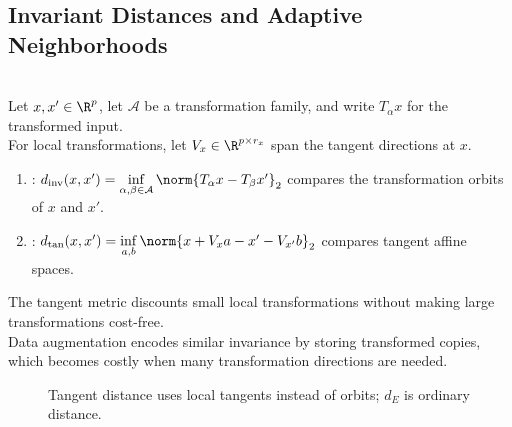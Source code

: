 \subsection{Invariant Distances and Adaptive Neighborhoods}
\begin{method} \label{meth:sl-invariant-and-tangent-distance} \\
Let $x,x'\in\R^p$, let $\mathcal{A}$ be a transformation family, and write $T_\alpha x$ for the transformed input.\\
For local transformations, let $V_x\in\R^{p\times r_x}$ span the tangent directions at $x$.
\begin{enumerate}[label=(\roman*)]
\setlength{\itemsep}{0pt}
\item {}: $d_{\mathrm{inv}}(x,x')=\inf\limits_{\alpha,\beta\in\mathcal{A}}\norm{T_\alpha x-T_\beta x'}_2$ compares the transformation orbits of $x$ and $x'$.
\item {}: $d_{\mathrm{tan}}(x,x')=\inf\limits_{a,b}\norm{x+V_xa-x'-V_{x'}b}_2$ compares tangent affine spaces.
\end{enumerate}
The tangent metric discounts small local transformations without making large transformations cost-free.\\
Data augmentation encodes similar invariance by storing transformed copies, which becomes costly when many transformation directions are needed.
\end{method}

\begin{figure}[H]
\centering

\caption{Tangent distance uses \textcolor{red!75!black}{local tangents} instead of \textcolor{green!65!black}{orbits}; \textcolor{blue!70!black}{$d_E$} is ordinary distance.}
\label{fig:sl-tangent-distance-schematic}
\end{figure}

